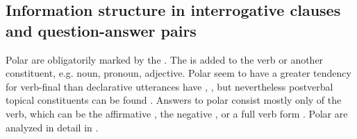 
\subsection{Information structure in interrogative clauses and question-answer pairs}
\label{ssec:Information structure in interrogative clauses and question-answer pairs}

Polar  are obligatorily marked by the  . The  is added to the verb or another constituent, e.g. noun, pronoun, adjective. Polar  seem to have a greater tendency for verb-final  than declarative utterances have , , but nevertheless postverbal topical constituents can be found . Answers to polar  consist mostly only of the verb, which can be the affirmative  , the negative  , or a full verb form . Polar  are analyzed in detail in .
%
